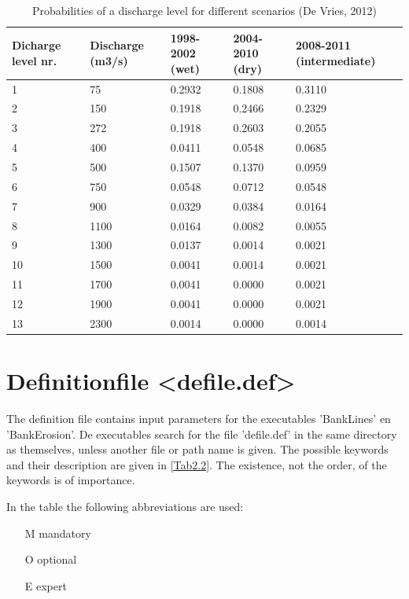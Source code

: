 \begin{table}
\begin{tabular}{p{2cm}p{2cm}p{2cm}p{2cm}p{2cm}}
Dicharge level nr. & Discharge (m3/s) & 1998-2002 (wet) & 2004-2010 (dry) & 2008-2011 (intermediate) \\ \hline
1 & 75 & 0.2932 & 0.1808 & 0.3110 \\
2 & 150 & 0.1918 & 0.2466 & 0.2329 \\
3 & 272 & 0.1918 & 0.2603 & 0.2055 \\
4 & 400 & 0.0411 & 0.0548 & 0.0685 \\
5 & 500 & 0.1507 & 0.1370 & 0.0959 \\
6 & 750 & 0.0548 & 0.0712 & 0.0548 \\
7 & 900 & 0.0329 & 0.0384 & 0.0164 \\
8 & 1100 & 0.0164 & 0.0082 & 0.0055 \\
9 & 1300 & 0.0137 & 0.0014 & 0.0021 \\
10 & 1500 & 0.0041 & 0.0014 & 0.0021 \\
11 & 1700 & 0.0041 & 0.0000 & 0.0021 \\
12 & 1900 & 0.0041 & 0.0000 & 0.0021 \\
13 & 2300 & 0.0014 & 0.0000 & 0.0014 \\ \hline
\end{tabular}
\caption{Probabilities of a discharge level for different scenarios (De Vries, 2012)}
\label{Tab2.1}
\end{table}

\section{Definitionfile <defile.def>}\label{Sec2.4}

The definition file contains input parameters for the executables 'BankLines' en 'BankErosion'.
De executables search for the file 'defile.def' in the same directory as themselves, unless another file or path name is given.
The possible keywords and their description are given in \autoref{Tab2.2}.
The existence, not the order, of the keywords is of importance.

In the table the following abbreviations are used:
\begin{itemize}
\item[M] mandatory
\item[O] optional
\item[E] expert
\end{itemize}

